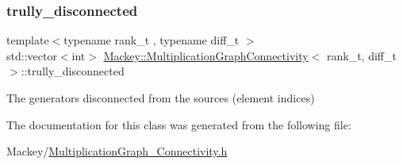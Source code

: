 \subsubsection{\texorpdfstring{trully\+\_\+disconnected}{trully\_disconnected}}
{\footnotesize\ttfamily template$<$typename rank\+\_\+t , typename diff\+\_\+t $>$ \\
std\+::vector$<$int$>$ \hyperlink{classMackey_1_1MultiplicationGraphConnectivity}{Mackey\+::\+Multiplication\+Graph\+Connectivity}$<$ rank\+\_\+t, diff\+\_\+t $>$\+::trully\+\_\+disconnected}



The generators disconnected from the sources (element indices) 



The documentation for this class was generated from the following file\+:\begin{DoxyCompactItemize}
\item 
Mackey/\hyperlink{MultiplicationGraph__Connectivity_8h}{Multiplication\+Graph\+\_\+\+Connectivity.\+h}\end{DoxyCompactItemize}
